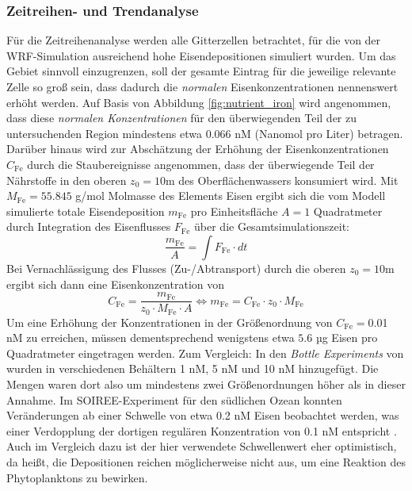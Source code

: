 \documentclass[12pt,a4paper,onecolumn,draft]{scrartcl}
\begin{document}
\subsubsection{Zeitreihen- und Trendanalyse} \label{sec:timeseries}
Für die Zeitreihenanalyse werden alle Gitterzellen betrachtet, für die von der WRF-Simulation ausreichend hohe Eisendepositionen simuliert wurden. Um das Gebiet sinnvoll einzugrenzen, soll der gesamte Eintrag für die jeweilige relevante Zelle so groß sein, dass dadurch die \textit{normalen} Eisenkonzentrationen nennenswert erhöht werden. Auf Basis von Abbildung \ref{fig:nutrient_iron} wird angenommen, dass diese \textit{normalen Konzentrationen} für den überwiegenden Teil der zu untersuchenden Region mindestens etwa 0.066 nM (Nanomol pro Liter) betragen. Darüber hinaus wird zur Abschätzung der Erhöhung der Eisenkonzentrationen $C_\text{Fe}$ durch die Staubereignisse angenommen, dass der überwiegende Teil der Nährstoffe in den oberen $z_0 = 10$m des Oberflächenwassers konsumiert wird. Mit  $M_{\text{Fe}} =  55.845$ g/mol Molmasse des Elements Eisen ergibt sich die vom Modell simulierte totale Eisendeposition $m_\text{Fe}$ pro Einheitsfläche $A=1$ Quadratmeter durch Integration des Eisenflusses $F_\text{Fe}$ über die Gesamtsimulationszeit:
\begin{equation}
\frac{m_\text{Fe}}{A} = \int F_\text{Fe} \cdot dt
\end{equation}
Bei Vernachlässigung des Flusses (Zu-/Abtransport) durch die oberen $z_0=10$m ergibt sich dann eine Eisenkonzentration von
\begin{equation}
C_\text{Fe} = \frac{m_\text{Fe}}{z_0 \cdot M_{\text{Fe}} \cdot A} \Leftrightarrow m_\text{Fe} = C_\text{Fe} \cdot z_0 \cdot M_{\text{Fe}}
\end{equation}
Um eine Erhöhung der Konzentrationen in der Größenordnung von $C_\text{Fe}=$0.01 nM zu erreichen, müssen dementsprechend wenigstens etwa $5.6$ µg Eisen pro Quadratmeter eingetragen werden. Zum Vergleich: In den \textit{Bottle Experiments} von \citet{Martin.1988} wurden in verschiedenen Behältern 1 nM, 5 nM und 10 nM hinzugefügt. Die Mengen waren dort also um mindestens zwei Größenordnungen höher als in dieser Annahme. Im SOIREE-Experiment für den südlichen Ozean \citep{Trull.2001} konnten Veränderungen ab einer Schwelle von etwa 0.2 nM Eisen beobachtet werden, was einer Verdopplung der dortigen regulären Konzentration von 0.1 nM entspricht \citep{Boyd.2010}. Auch im Vergleich dazu ist der hier verwendete Schwellenwert eher optimistisch, da heißt, die Depositionen reichen möglicherweise nicht aus, um eine Reaktion des Phytoplanktons zu bewirken. \\
\end{document}
